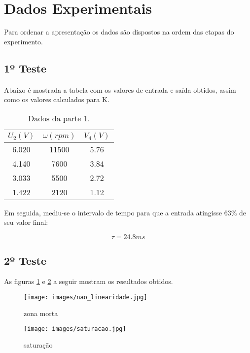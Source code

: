 \section{Dados Experimentais}
Para ordenar a apresentação os dados são dispostos na ordem das etapas do experimento.
\subsection{1º Teste}
\paragraph{}
Abaixo é mostrada a tabela com os valores de entrada e saída obtidos, assim como os valores calculados para K.


\begin{table}[H]
\centering
\begin{tabular}{|c|c|c|}
\hline
$U_2(V)$ & $\omega (rpm)$ & $V_4(V)$\\
\hline
6.020 & 11500 & 5.76\\
\hline
4.140 & 7600 & 3.84\\
\hline
3.033 & 5500 & 2.72\\
\hline
1.422 & 2120 & 1.12\\
\hline
\end{tabular}
\caption{Dados da parte 1.}
\label{tab:teste1}
\end{table}

Em seguida, mediu-se o intervalo de tempo para que a entrada atingisse 63\% de seu valor final:


\begin{equation}
\boxed{\tau=24.8ms}
\end{equation}


\subsection{2º Teste}
As figuras \ref{fig:dadosB_nao_linearidade} e \ref{fig:dadosB_saturacao} a seguir mostram os resultados obtidos.

\begin{figure}[H]
  \centering
	\texttt{[image: images/nao\_linearidade.jpg]}
\caption{zona morta}
\label{fig:dadosB_nao_linearidade}
\end{figure}

\begin{figure}[H]
  \centering
	\texttt{[image: images/saturacao.jpg]}
\caption{saturação}
\label{fig:dadosB_saturacao}
\end{figure}

